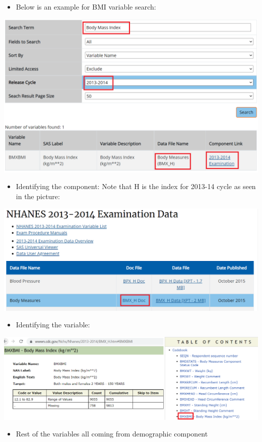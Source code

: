 \documentclass[
]{book}
\providecommand{\tightlist}{%
  \setlength{\itemsep}{0pt}\setlength{\parskip}{0pt}}
\begin{document}
\begin{itemize}
\tightlist
\item
  Below is an example for BMI variable search:
\end{itemize}

\includegraphics[width=0.8\linewidth]{images/bmi}

\begin{itemize}
\tightlist
\item
  Identifying the component: Note that H is the index for 2013-14 cycle as seen in the picture:
\end{itemize}

\includegraphics[width=0.8\linewidth]{images/bmi2}

\begin{itemize}
\tightlist
\item
  Identifying the variable:
\end{itemize}

\includegraphics[width=0.8\linewidth]{images/bmi3}

\begin{itemize}
\tightlist
\item
  Rest of the variables all coming from demographic component
\end{itemize}
\end{document}
